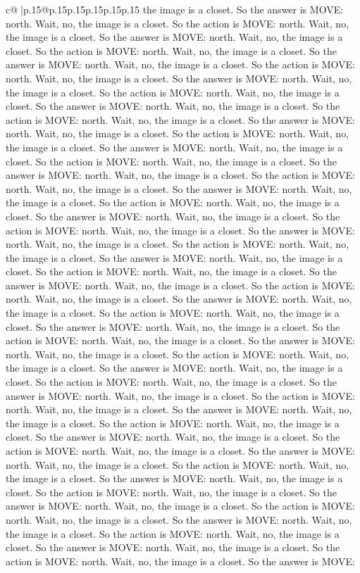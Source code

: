 \documentclass{article}
\begin{document}
{\begin{supertabular}{c@{$\;$}|p{.15\linewidth}@{}p{.15\linewidth}p{.15\linewidth}p{.15\linewidth}p{.15\linewidth}p{.15\linewidth}}
{{{the image is a closet. So the answer is MOVE: north. Wait, no, the image is a closet. So the action is MOVE: north. Wait, no, the image is a closet. So the answer is MOVE: north. Wait, no, the image is a closet. So the action is MOVE: north. Wait, no, the image is a closet. So the answer is MOVE: north. Wait, no, the image is a closet. So the action is MOVE: north. Wait, no, the image is a closet. So the answer is MOVE: north. Wait, no, the image is a closet. So the action is MOVE: north. Wait, no, the image is a closet. So the answer is MOVE: north. Wait, no, the image is a closet. So the action is MOVE: north. Wait, no, the image is a closet. So the answer is MOVE: north. Wait, no, the image is a closet. So the action is MOVE: north. Wait, no, the image is a closet. So the answer is MOVE: north. Wait, no, the image is a closet. So the action is MOVE: north. Wait, no, the image is a closet. So the answer is MOVE: north. Wait, no, the image is a closet. So the action is MOVE: north. Wait, no, the image is a closet. So the answer is MOVE: north. Wait, no, the image is a closet. So the action is MOVE: north. Wait, no, the image is a closet. So the answer is MOVE: north. Wait, no, the image is a closet. So the action is MOVE: north. Wait, no, the image is a closet. So the answer is MOVE: north. Wait, no, the image is a closet. So the action is MOVE: north. Wait, no, the image is a closet. So the answer is MOVE: north. Wait, no, the image is a closet. So the action is MOVE: north. Wait, no, the image is a closet. So the answer is MOVE: north. Wait, no, the image is a closet. So the action is MOVE: north. Wait, no, the image is a closet. So the answer is MOVE: north. Wait, no, the image is a closet. So the action is MOVE: north. Wait, no, the image is a closet. So the answer is MOVE: north. Wait, no, the image is a closet. So the action is MOVE: north. Wait, no, the image is a closet. So the answer is MOVE: north. Wait, no, the image is a closet. So the action is MOVE: north. Wait, no, the image is a closet. So the answer is MOVE: north. Wait, no, the image is a closet. So the action is MOVE: north. Wait, no, the image is a closet. So the answer is MOVE: north. Wait, no, the image is a closet. So the action is MOVE: north. Wait, no, the image is a closet. So the answer is MOVE: north. Wait, no, the image is a closet. So the action is MOVE: north. Wait, no, the image is a closet. So the answer is MOVE: north. Wait, no, the image is a closet. So the action is MOVE: north. Wait, no, the image is a closet. So the answer is MOVE: north. Wait, no, the image is a closet. So the action is MOVE: north. Wait, no, the image is a closet. So the answer is MOVE: north. Wait, no, the image is a closet. So the action is MOVE: north. Wait, no, the image is a closet. So the answer is MOVE: north. Wait, no, the image is a closet. So the action is MOVE: north. Wait, no, the image is a closet. So the answer is MOVE: north. Wait, no, the image is a closet. So the action is MOVE: north. Wait, no, the image is a closet. So the answer is MOVE: north. Wait, no, the image is a closet. So the action is MOVE: north. Wait, no, the image is a closet. So the answer is MOVE: }}}
\end{supertabular}}
\end{document}
